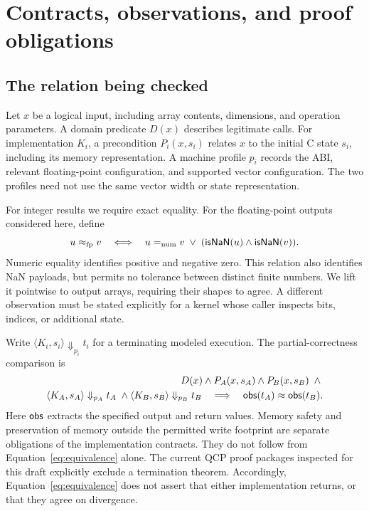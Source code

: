 \section{Contracts, observations, and proof obligations}
\label{sec:guarantee}

\subsection{The relation being checked}
Let $x$ be a logical input, including array contents, dimensions, and operation parameters. A domain predicate $D(x)$ describes legitimate calls. For implementation $K_i$, a precondition $P_i(x,s_i)$ relates $x$ to the initial C state $s_i$, including its memory representation. A machine profile $p_i$ records the ABI, relevant floating-point configuration, and supported vector configuration. The two profiles need not use the same vector width or state representation.

For integer results we require exact equality. For the floating-point outputs considered here, define
\begin{equation}
 u\approx_{\mathrm{fp}}v
 \quad\Longleftrightarrow\quad
 u=_{\mathrm{num}}v\;\lor\;(\mathsf{isNaN}(u)\land\mathsf{isNaN}(v)).
 \label{eq:float}
\end{equation}
Numeric equality identifies positive and negative zero. This relation also identifies NaN payloads, but permits no tolerance between distinct finite numbers. We lift it pointwise to output arrays, requiring their shapes to agree. A different observation must be stated explicitly for a kernel whose caller inspects bits, indices, or additional state.

Write $\langle K_i,s_i\rangle\Downarrow_{p_i}t_i$ for a terminating modeled execution. The partial-correctness comparison is
\begin{equation}
\begin{split}
 D(x)\land P_A(x,s_A)\land P_B(x,s_B)\;\land{}\\
 \langle K_A,s_A\rangle\Downarrow_{p_A}t_A\;\land{}
 \langle K_B,s_B\rangle\Downarrow_{p_B}t_B
 \quad\Longrightarrow\quad \mathsf{obs}(t_A)\approx\mathsf{obs}(t_B).
\end{split}
\label{eq:equivalence}
\end{equation}
Here $\mathsf{obs}$ extracts the specified output and return values. Memory safety and preservation of memory outside the permitted write footprint are separate obligations of the implementation contracts. They do not follow from Equation~\ref{eq:equivalence} alone. The current QCP proof packages inspected for this draft explicitly exclude a termination theorem. Accordingly, Equation~\ref{eq:equivalence} does not assert that either implementation returns, or that they agree on divergence. 

